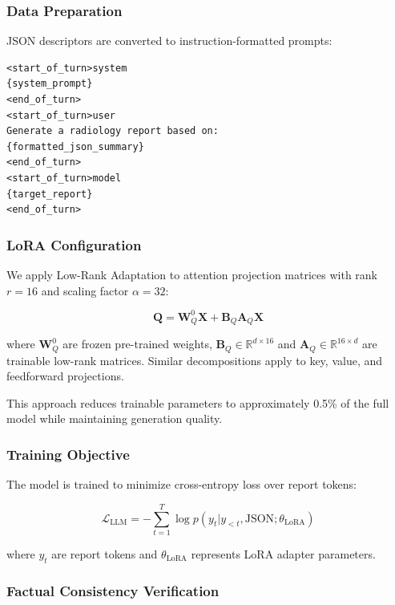 \documentclass[conference]{IEEEtran}
\begin{document}
\subsubsection{Data Preparation}

JSON descriptors are converted to instruction-formatted prompts:

\begin{verbatim}
<start_of_turn>system
{system_prompt}
<end_of_turn>
<start_of_turn>user
Generate a radiology report based on:
{formatted_json_summary}
<end_of_turn>
<start_of_turn>model
{target_report}
<end_of_turn>
\end{verbatim}

\subsubsection{LoRA Configuration}

We apply Low-Rank Adaptation to attention projection matrices with rank $r=16$ and scaling factor $\alpha=32$:

\begin{equation}
\mathbf{Q} = \mathbf{W}_Q^0 \mathbf{X} + \mathbf{B}_Q \mathbf{A}_Q \mathbf{X}
\end{equation}

where $\mathbf{W}_Q^0$ are frozen pre-trained weights, $\mathbf{B}_Q \in \mathbb{R}^{d \times 16}$ and $\mathbf{A}_Q \in \mathbb{R}^{16 \times d}$ are trainable low-rank matrices. Similar decompositions apply to key, value, and feedforward projections.

This approach reduces trainable parameters to approximately 0.5\% of the full model while maintaining generation quality.

\subsubsection{Training Objective}

The model is trained to minimize cross-entropy loss over report tokens:

\begin{equation}
\mathcal{L}_{\text{LLM}} = -\sum_{t=1}^{T} \log p(y_t | y_{<t}, \text{JSON}; \theta_{\text{LoRA}})
\end{equation}

where $y_t$ are report tokens and $\theta_{\text{LoRA}}$ represents LoRA adapter parameters.

\subsubsection{Factual Consistency Verification}
\end{document}
